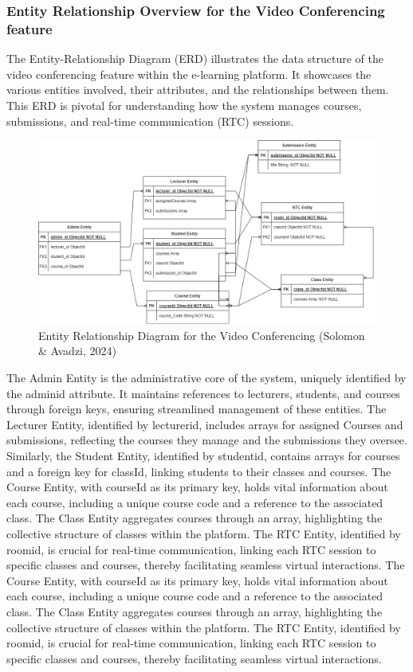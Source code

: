 \documentclass[a4paper,12pt]{article}  %
\begin{document}
\subsubsection{Entity Relationship Overview for the Video Conferencing feature}
The Entity-Relationship Diagram (ERD) illustrates the data structure of the video conferencing feature within the e-learning platform. It showcases the various entities involved, their attributes, and the relationships between them. This ERD is pivotal for understanding how the system manages courses, submissions, and real-time communication (RTC) sessions.\\

\begin{figure}[H]
      \centering
      \includegraphics[width=1\textwidth]{figures/entity-relationship diagram.drawio.png}
      \caption{Entity Relationship Diagram for the Video Conferencing (Solomon \& Avadzi, 2024)}
\end{figure}
The Admin Entity is the administrative core of the system, uniquely identified by the adminid attribute. It maintains references to lecturers, students, and courses through foreign keys, ensuring streamlined management of these entities. The Lecturer Entity, identified by lecturerid, includes arrays for assigned Courses and submissions, reflecting the courses they manage and the submissions they oversee. Similarly, the Student Entity, identified by studentid, contains arrays for courses and a foreign key for classId, linking students to their classes and courses. The Course Entity, with courseId as its primary key, holds vital information about each course, including a unique course code and a reference to the associated class. The Class Entity aggregates courses through an array, highlighting the collective structure of classes within the platform. The RTC Entity, identified by roomid, is crucial for real-time communication, linking each RTC session to specific classes and courses, thereby facilitating seamless virtual interactions. The Course Entity, with courseId as its primary key, holds vital information about each course, including a unique course code and a reference to the associated class. The Class Entity aggregates courses through an array, highlighting the collective structure of classes within the platform.  The RTC Entity, identified by roomid, is crucial for real-time communication, linking each RTC session to specific classes and courses, thereby facilitating seamless virtual interactions.\\
\end{document}
